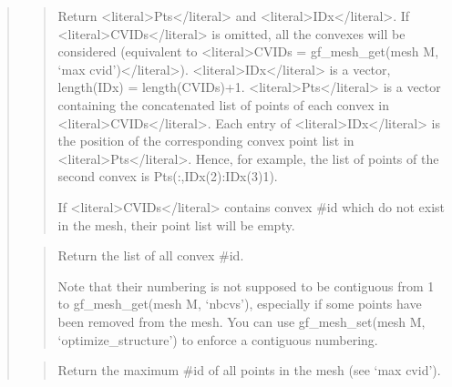 \documentclass[a4paper,11pt,english]{sphinxmanual}
\begin{document}
\begin{quote}
\begin{quote}
\sphinxAtStartPar
Return \textless{}literal\textgreater{}Pts\textless{}/literal\textgreater{} and \textless{}literal\textgreater{}IDx\textless{}/literal\textgreater{}.
If \textless{}literal\textgreater{}CVIDs\textless{}/literal\textgreater{} is omitted, all the convexes will be considered
(equivalent to \textless{}literal\textgreater{}CVIDs = gf\_mesh\_get(mesh M, ‘max cvid’)\textless{}/literal\textgreater{}). \textless{}literal\textgreater{}IDx\textless{}/literal\textgreater{} is a
vector, length(IDx) = length(CVIDs)+1. \textless{}literal\textgreater{}Pts\textless{}/literal\textgreater{} is a
vector containing the concatenated list of points
of each convex in \textless{}literal\textgreater{}CVIDs\textless{}/literal\textgreater{}. Each entry of \textless{}literal\textgreater{}IDx\textless{}/literal\textgreater{} is the position
of the corresponding convex point list in \textless{}literal\textgreater{}Pts\textless{}/literal\textgreater{}. Hence, for
example, the list of points of the second convex is
Pts(:,IDx(2):IDx(3)\sphinxhyphen{}1).

\sphinxAtStartPar
If \textless{}literal\textgreater{}CVIDs\textless{}/literal\textgreater{} contains convex \#id which do not exist in the mesh,
their point list will be empty.
\end{quote}

\sphinxAtStartPar
{}
\begin{quote}

\sphinxAtStartPar
Return the list of all convex \#id.

\sphinxAtStartPar
Note that their numbering is not supposed to be contiguous from
1 to gf\_mesh\_get(mesh M, ‘nbcvs’),
especially if some points have been removed from the mesh. You
can use gf\_mesh\_set(mesh M, ‘optimize\_structure’) to enforce a contiguous
numbering.
\end{quote}

\sphinxAtStartPar
{}
\begin{quote}

\sphinxAtStartPar
Return the maximum \#id of all points in the mesh (see ‘max cvid’).
\end{quote}

\sphinxAtStartPar
{}
\begin{quote}


\end{quote}
\end{quote}
\end{document}
